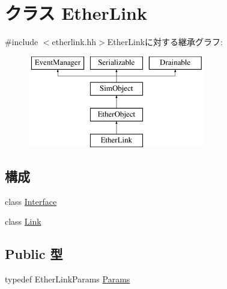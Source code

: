 \hypertarget{classEtherLink}{
\section{クラス EtherLink}
\label{classEtherLink}
}


{\ttfamily \#include $<$etherlink.hh$>$}EtherLinkに対する継承グラフ:\begin{figure}[H]
\begin{center}
\leavevmode
\includegraphics[height=4cm]{classEtherLink}
\end{center}
\end{figure}
\subsection*{構成}
\begin{DoxyCompactItemize}
\item 
class \hyperlink{classEtherLink_1_1Interface}{Interface}
\item 
class \hyperlink{classEtherLink_1_1Link}{Link}
\end{DoxyCompactItemize}
\subsection*{Public 型}
\begin{DoxyCompactItemize}
\item 
typedef EtherLinkParams \hyperlink{classEtherLink_ae2a807ee6467a63dfb496f847857b7df}{Params}
\end{DoxyCompactItemize}
